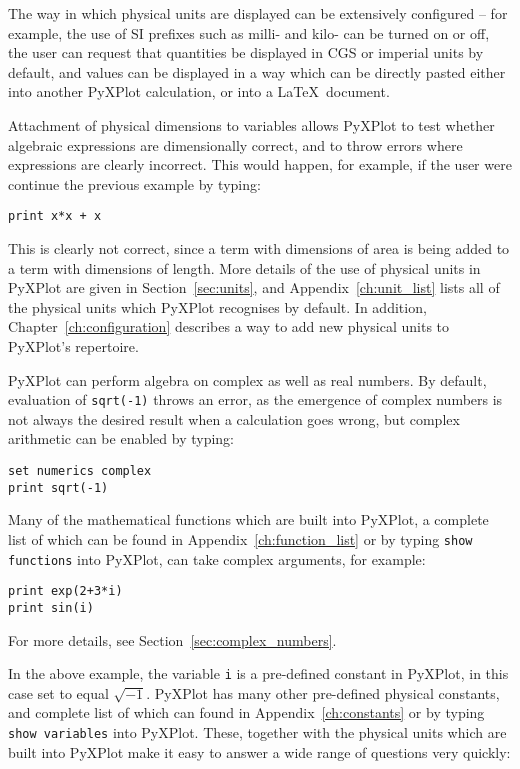 \noindent The way in which physical units are displayed can be extensively
configured -- for example, the use of SI prefixes such as milli- and kilo- can
be turned on or off, the user can request that quantities be displayed in CGS
or imperial units by default, and values can be displayed in a way which can be
directly pasted either into another PyXPlot calculation, or into a \LaTeX\
document.

Attachment of physical dimensions to variables allows PyXPlot to test whether
algebraic expressions are dimensionally correct, and to throw errors where
expressions are clearly incorrect. This would happen, for example, if the user
were continue the previous example by typing:

\begin{verbatim}
print x*x + x
\end{verbatim}

\noindent This is clearly not correct, since a term with dimensions of area is
being added to a term with dimensions of length. More details of the use of
physical units in PyXPlot are given in Section~\ref{sec:units}, and
Appendix~\ref{ch:unit_list} lists all of the physical units which PyXPlot
recognises by default. In addition, Chapter~\ref{ch:configuration} describes a
way to add new physical units to PyXPlot's repertoire.

PyXPlot can perform algebra on complex as well as real numbers. By default,
evaluation of {\tt sqrt(-1)} throws an error, as the emergence of complex
numbers is not always the desired result when a calculation goes wrong, but
complex arithmetic can be enabled by typing:\indcmd{set numerics complex}

\begin{verbatim}
set numerics complex
print sqrt(-1)
\end{verbatim}

\noindent Many of the mathematical functions which are built into PyXPlot, a
complete list of which can be found in Appendix~\ref{ch:function_list} or by
typing {\tt show functions} into PyXPlot, can take complex arguments, for
example:

\begin{verbatim}
print exp(2+3*i)
print sin(i)
\end{verbatim}

\noindent For more details, see Section~\ref{sec:complex_numbers}.

In the above example, the variable {\tt i} is a pre-defined constant in
PyXPlot, in this case set to equal $\sqrt{-1}$. PyXPlot has many other
pre-defined physical constants, and complete list of which can found in
Appendix~\ref{ch:constants} or by typing {\tt show variables} into PyXPlot.
These, together with the physical units which are built into PyXPlot make it
easy to answer a wide range of questions very quickly:

